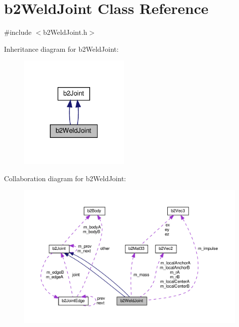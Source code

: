 \hypertarget{classb2WeldJoint}{}\section{b2\+Weld\+Joint Class Reference}
\label{classb2WeldJoint}


{\ttfamily \#include $<$b2\+Weld\+Joint.\+h$>$}



Inheritance diagram for b2\+Weld\+Joint\+:
\nopagebreak
\begin{figure}[H]
\begin{center}
\leavevmode
\includegraphics[width=151pt]{classb2WeldJoint__inherit__graph}
\end{center}
\end{figure}


Collaboration diagram for b2\+Weld\+Joint\+:
\nopagebreak
\begin{figure}[H]
\begin{center}
\leavevmode
\includegraphics[width=350pt]{classb2WeldJoint__coll__graph}
\end{center}
\end{figure}
